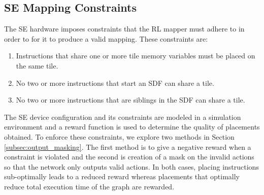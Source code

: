 \subsection{SE Mapping Constraints}
The SE hardware imposes constraints that the RL mapper must adhere to in order to for it to produce a valid mapping. These constraints are:
\begin{enumerate}
  \item Instructions that share one or more tile memory variables must be placed on the same tile.
  \item No two or more instructions that start an SDF can share a tile.
  \item No two or more instructions that are siblings in the SDF can share a tile.
\end{enumerate}
The SE device configuration and its constraints are modeled in a simulation environment and a reward function is used to determine the quality of placements obtained.
To enforce these constraints, we explore two methods in Section \ref{subsec:output_masking}.
The first method is to give a negative reward when a constraint is violated and the second is creation of a mask on the invalid actions so that the network only outputs valid actions.
In both cases, placing instructions sub-optimally leads to a reduced reward whereas placements that optimally reduce total execution time of the graph are rewarded. 